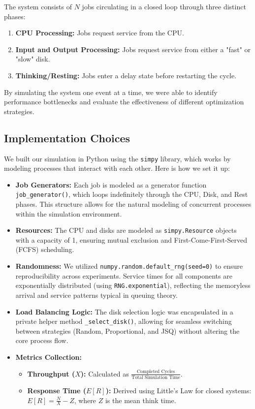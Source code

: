\documentclass[a4paper,10pt]{article}
\begin{document}
The system consists of $N$ jobs circulating in a closed loop through three distinct phases:
\begin{enumerate}
    \item \textbf{CPU Processing:} Jobs request service from the CPU.
    \item \textbf{Input and Output Processing:} Jobs request service from either a "fast" or "slow" disk.
    \item \textbf{Thinking/Resting:} Jobs enter a delay state before restarting the cycle.
\end{enumerate}

By simulating the system one event at a time, we were able to identify performance bottlenecks and evaluate the effectiveness of different optimization strategies.

\subsection{Implementation Choices}
We built our simulation in Python using the \texttt{simpy} library, which works by modeling processes that interact with each other. Here is how we set it up:

\begin{itemize}
    \item \textbf{Job Generators:} Each job is modeled as a generator function \texttt{job\_generator()}, which loops indefinitely through the CPU, Disk, and Rest phases. This structure allows for the natural modeling of concurrent processes within the simulation environment.
    \item \textbf{Resources:} The CPU and disks are modeled as \texttt{simpy.Resource} objects with a capacity of 1, ensuring mutual exclusion and First-Come-First-Served (FCFS) scheduling.
    \item \textbf{Randomness:} We utilized \texttt{numpy.random.default\_rng(seed=0)} to ensure reproducibility across experiments. Service times for all components are exponentially distributed (using \texttt{RNG.exponential}), reflecting the memoryless arrival and service patterns typical in queuing theory.
    \item \textbf{Load Balancing Logic:} The disk selection logic was encapsulated in a private helper method \texttt{\_select\_disk()}, allowing for seamless switching between strategies (Random, Proportional, and JSQ) without altering the core process flow.
    \item \textbf{Metrics Collection:} 
    \begin{itemize}
        \item \textbf{Throughput ($X$):} Calculated as $\frac{\text{Completed Cycles}}{\text{Total Simulation Time}}$.
        \item \textbf{Response Time ($E[R]$):} Derived using Little's Law for closed systems: $E[R] = \frac{N}{X} - Z$, where $Z$ is the mean think time. \cite{littles_law_cfi} \cite{factorio_littles_law}
    \end{itemize}
\end{itemize}
\end{document}
